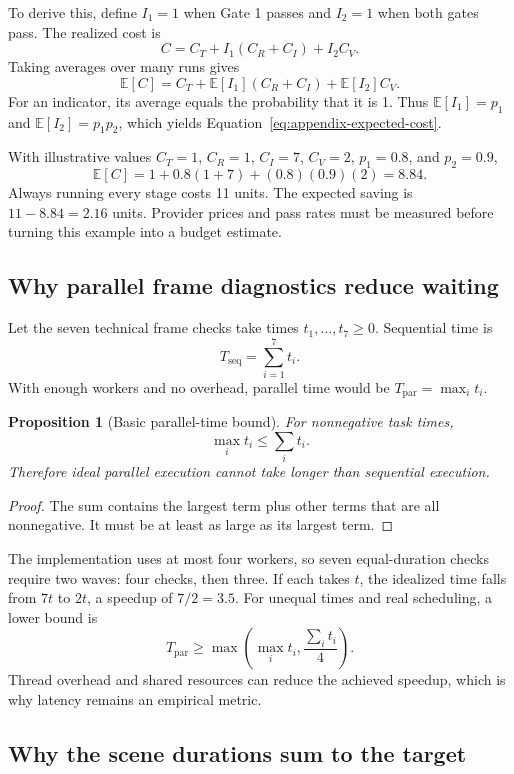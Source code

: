 \documentclass[11pt]{article}
\theoremstyle{plain}
\newtheorem{proposition}{Proposition}[section]
\theoremstyle{definition}
\begin{document}
To derive this, define $I_1=1$ when Gate 1 passes and $I_2=1$ when both gates pass. The realized cost is
\[
C=C_T+I_1(C_R+C_I)+I_2C_V.
\]
Taking averages over many runs gives
\[
\mathbb{E}[C]=C_T+\mathbb{E}[I_1](C_R+C_I)+\mathbb{E}[I_2]C_V.
\]
For an indicator, its average equals the probability that it is 1. Thus $\mathbb{E}[I_1]=p_1$ and $\mathbb{E}[I_2]=p_1p_2$, which yields Equation~\eqref{eq:appendix-expected-cost}.

With illustrative values $C_T=1$, $C_R=1$, $C_I=7$, $C_V=2$, $p_1=0.8$, and $p_2=0.9$,
\[
\mathbb{E}[C]=1+0.8(1+7)+(0.8)(0.9)(2)=8.84.
\]
Always running every stage costs 11 units. The expected saving is $11-8.84=2.16$ units. Provider prices and pass rates must be measured before turning this example into a budget estimate.

\subsection{Why parallel frame diagnostics reduce waiting}

Let the seven technical frame checks take times $t_1,\ldots,t_7\ge0$. Sequential time is
\[
T_{\mathrm{seq}}=\sum_{i=1}^7t_i.
\]
With enough workers and no overhead, parallel time would be $T_{\mathrm{par}}=\max_i t_i$.

\begin{proposition}[Basic parallel-time bound]
\label{prop:parallel}
For nonnegative task times,
\[
\max_i t_i\le\sum_i t_i.
\]
Therefore ideal parallel execution cannot take longer than sequential execution.
\end{proposition}

\begin{proof}
The sum contains the largest term plus other terms that are all nonnegative. It must be at least as large as its largest term.
\end{proof}

The implementation uses at most four workers, so seven equal-duration checks require two waves: four checks, then three. If each takes $t$, the idealized time falls from $7t$ to $2t$, a speedup of $7/2=3.5$. For unequal times and real scheduling, a lower bound is
\[
T_{\mathrm{par}}\ge\max\left(\max_i t_i,\frac{\sum_i t_i}{4}\right).
\]
Thread overhead and shared resources can reduce the achieved speedup, which is why latency remains an empirical metric.

\subsection{Why the scene durations sum to the target}
\end{document}
